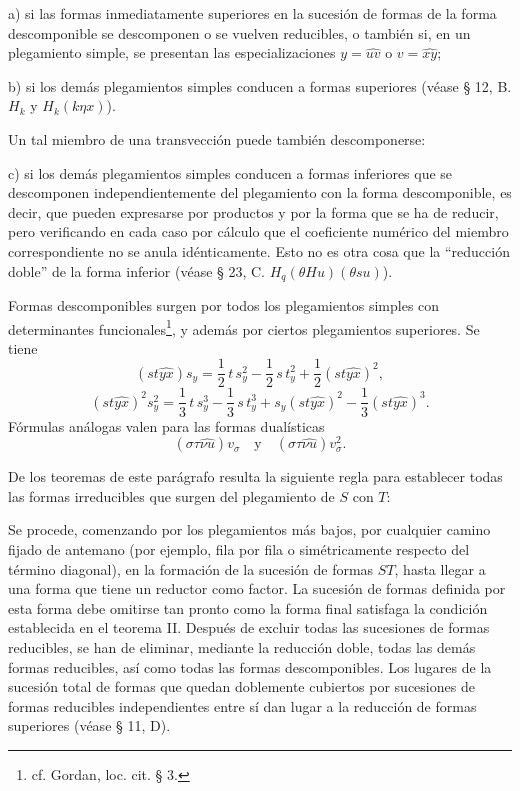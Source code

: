 \documentclass[11pt]{article}
\begin{document}
a) si las formas inmediatamente superiores en la sucesión de formas de la forma descomponible se descomponen o se vuelven reducibles, o también si, en un plegamiento simple, se presentan las especializaciones $y=\widehat{uv}$ o $v=\widehat{xy}$;

b) si los demás plegamientos simples conducen a formas superiores (véase § 12, B. $H_k$ y $H_k(k\eta x)$).

Un tal miembro de una transvección puede también descomponerse:

c) si los demás plegamientos simples conducen a formas inferiores que se descomponen independientemente del plegamiento con la forma descomponible, es decir, que pueden expresarse por productos y por la forma que se ha de reducir, pero verificando en cada caso por cálculo que el coeficiente numérico del miembro correspondiente no se anula idénticamente. Esto no es otra cosa que la ``reducción doble'' de la forma inferior (véase § 23, C. $H_q(\theta H u)(\theta s u)$).

Formas descomponibles surgen por todos los plegamientos simples con determinantes funcionales\footnote{cf. Gordan, loc. cit. § 3.}, y además por ciertos plegamientos superiores. Se tiene
\[
(st\widehat{yx})s_y=\frac12\,t\,s_y^2-\frac12\,s\,t_y^2+\frac12(st\widehat{yx})^2,
\]
\[
(st\widehat{yx})^2s_y^2=\frac13\,t\,s_y^3-\frac13\,s\,t_y^3+s_y(st\widehat{yx})^2-\frac13(st\widehat{yx})^3.
\]
Fórmulas análogas valen para las formas dualísticas
\[
(\sigma\tau\widehat{\nu u})v_\sigma
\quad\text{y}\quad
(\sigma\tau\widehat{\nu u})v_\sigma^2.
\]

De los teoremas de este parágrafo resulta la siguiente regla para establecer todas las formas irreducibles que surgen del plegamiento de $S$ con $T$:

Se procede, comenzando por los plegamientos más bajos, por cualquier camino fijado de antemano (por ejemplo, fila por fila o simétricamente respecto del término diagonal), en la formación de la sucesión de formas $ST$, hasta llegar a una forma que tiene un reductor como factor. La sucesión de formas definida por esta forma debe omitirse tan pronto como la forma final satisfaga la condición establecida en el teorema II. Después de excluir todas las sucesiones de formas reducibles, se han de eliminar, mediante la reducción doble, todas las demás formas reducibles, así como todas las formas descomponibles. Los lugares de la sucesión total de formas que quedan doblemente cubiertos por sucesiones de formas reducibles independientes entre sí dan lugar a la reducción de formas superiores (véase § 11, D).
\end{document}
